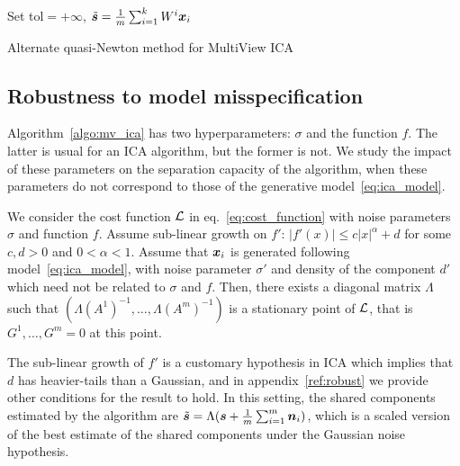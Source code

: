 \begin{algorithm}[H]
\label{algo:mv_ica}
\SetAlgoLined
{}
Set tol$=+\infty$, $\tilde{\boldsymbol{s}} = \frac1m\sum_{i=1}^kW^i\boldsymbol{x}_i$\\
 \caption{Alternate quasi-Newton method for MultiView ICA}
\end{algorithm}
%
%
%
%
\subsection{Robustness to model misspecification}
Algorithm~\ref{algo:mv_ica} has two hyperparameters: $\sigma$ and the function $f$.
%
The latter is usual for an ICA algorithm, but the former is not.
%
We study the impact of these parameters on the separation capacity of the algorithm, when these parameters do not correspond to those of the generative model~\eqref{eq:ica_model}.
%
\begin{proposition}
\label{prop:robust}
We consider the cost function $\mathcal{L}$ in eq.~\eqref{eq:cost_function} with noise parameters $\sigma$ and function $f$.
%
Assume sub-linear growth on $f'$: $|f'(x)|\leq c|x|^{\alpha} + d$ for some $c, d > 0$ and $0<\alpha<1$.
%
Assume that $\boldsymbol{x}_i$ is generated following model~\eqref{eq:ica_model}, with noise parameter $\sigma'$ and density of the component $d'$ which need not be related to $\sigma$ and $f$.
%
Then, there exists a diagonal matrix $\Lambda$ such that $(\Lambda (A^1)^{-1}, \dots, \Lambda (A^m)^{-1})$ is a stationary point of $\mathcal{L}$, that is $G^1,\dots, G^m =0$ at this point.
\end{proposition}
%
The sub-linear growth of $f'$ is a customary hypothesis in ICA which implies that $d$ has heavier-tails than a Gaussian, and in appendix~\ref{ref:robust} we provide other conditions for the result to hold.
%
In this setting, the shared components estimated by the algorithm are $\tilde{\boldsymbol{s}} = \Lambda (\boldsymbol{s} + \frac1m \sum_{i=1}^m \boldsymbol{n}_i)$, which is a scaled version of the best estimate of the shared components under the Gaussian noise hypothesis.

